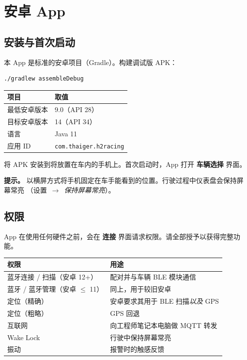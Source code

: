 \documentclass[11pt,a4paper,oneside]{report}
\newcommand{\arrow}{\,$\rightarrow$\,}
\newcommand{\code}[1]{\texttt{#1}}
\begin{document}
\section{安卓 App}

\subsection{安装与首次启动}
本 App 是标准的安卓项目（Gradle）。构建调试版 APK：

\begin{lstlisting}
./gradlew assembleDebug
\end{lstlisting}

\begin{tabularx}{\linewidth}{@{}lL@{}}
\toprule
\textbf{项目} & \textbf{取值}\\
\midrule
最低安卓版本 & 9.0（API 28）\\
目标安卓版本 & 14（API 34）\\
语言 & Java 11\\
应用 ID & \code{com.thaiger.h2racing}\\
\bottomrule
\end{tabularx}

\medskip
将 APK 安装到将放置在车内的手机上。首次启动时，App 打开 \textbf{车辆选择} 界面。
\begin{tgnote}
\textbf{提示。} 以横屏方式将手机固定在车手能看到的位置。行驶过程中仪表盘会保持屏幕常亮
（设置 \arrow{} \emph{保持屏幕常亮}）。
\end{tgnote}

\subsection{权限}
App 在使用任何硬件之前，会在 \textbf{连接} 界面请求权限。请全部授予以获得完整功能。

\begin{tabularx}{\linewidth}{@{}lL@{}}
\toprule
\textbf{权限} & \textbf{用途}\\
\midrule
蓝牙连接 / 扫描（安卓 12+） & 配对并与车辆 BLE 模块通信\\
蓝牙 / 蓝牙管理（安卓 $\le$ 11） & 同上，用于较旧安卓\\
定位（精确） & 安卓要求其用于 BLE 扫描\emph{以及} GPS\\
定位（粗略） & GPS 回退\\
互联网 & 向工程师笔记本电脑做 MQTT 转发\\
Wake Lock & 行驶中保持屏幕常亮\\
振动 & 报警时的触感反馈\\
\bottomrule
\end{tabularx}
\end{document}
